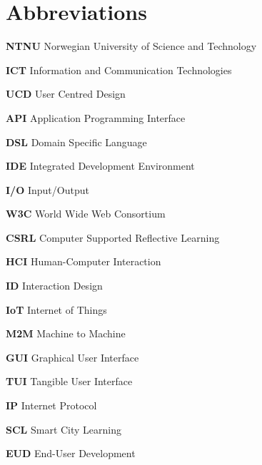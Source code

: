\chapter{Abbreviations}\label{abbreviations}

\textbf{NTNU} Norwegian University of Science and Technology

\textbf{ICT} Information and Communication Technologies

\textbf{UCD} User Centred Design

\textbf{API} Application Programming Interface

\textbf{DSL} Domain Specific Language

\textbf{IDE} Integrated Development Environment

\textbf{I/O} Input/Output

\textbf{W3C} World Wide Web Consortium

\textbf{CSRL} Computer Supported Reflective Learning

\textbf{HCI} Human-Computer Interaction

\textbf{ID} Interaction Design

\textbf{IoT} Internet of Things

\textbf{M2M} Machine to Machine

\textbf{GUI} Graphical User Interface

\textbf{TUI} Tangible User Interface

\textbf{IP} Internet Protocol

\textbf{SCL} Smart City Learning

\textbf{EUD} End-User Development